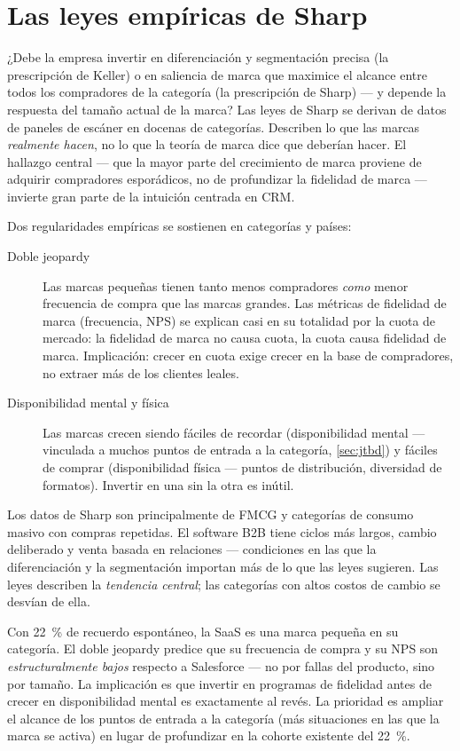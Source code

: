 \section{Las leyes empíricas de Sharp}\label{sec:sharp}

¿Debe la empresa invertir en diferenciación y segmentación precisa (la prescripción de Keller) o en saliencia de marca que maximice el alcance entre todos los compradores de la categoría (la prescripción de Sharp) --- y depende la respuesta del tamaño actual de la marca? Las leyes de Sharp se derivan de datos de paneles de escáner en docenas de categorías. Describen lo que las marcas \emph{realmente hacen}, no lo que la teoría de marca dice que deberían hacer. El hallazgo central --- que la mayor parte del crecimiento de marca proviene de adquirir compradores esporádicos, no de profundizar la fidelidad de marca --- invierte gran parte de la intuición centrada en CRM.

Dos regularidades empíricas se sostienen en categorías y países:

\begin{description}
  \item[Doble jeopardy] Las marcas pequeñas tienen tanto menos compradores \emph{como} menor frecuencia de compra que las marcas grandes. Las métricas de fidelidad de marca (frecuencia, NPS) se explican casi en su totalidad por la cuota de mercado: la fidelidad de marca no causa cuota, la cuota causa fidelidad de marca. Implicación: crecer en cuota exige crecer en la base de compradores, no extraer más de los clientes leales.
  \item[Disponibilidad mental y física] Las marcas crecen siendo fáciles de recordar (disponibilidad mental --- vinculada a muchos puntos de entrada a la categoría, \cref{sec:jtbd}) y fáciles de comprar (disponibilidad física --- puntos de distribución, diversidad de formatos). Invertir en una sin la otra es inútil.
\end{description}

Los datos de Sharp son principalmente de FMCG y categorías de consumo masivo con compras repetidas. El software B2B tiene ciclos más largos, cambio deliberado y venta basada en relaciones --- condiciones en las que la diferenciación y la segmentación importan más de lo que las leyes sugieren. Las leyes describen la \emph{tendencia central}; las categorías con altos costos de cambio se desvían de ella.

\begin{example}
Con \qty{22}{\percent} de recuerdo espontáneo, la SaaS es una marca pequeña en su categoría. El doble jeopardy predice que su frecuencia de compra y su NPS son \emph{estructuralmente bajos} respecto a Salesforce --- no por fallas del producto, sino por tamaño. La implicación es que invertir en programas de fidelidad antes de crecer en disponibilidad mental es exactamente al revés. La prioridad es ampliar el alcance de los puntos de entrada a la categoría (más situaciones en las que la marca se activa) en lugar de profundizar en la cohorte existente del \qty{22}{\percent}.
\end{example}

